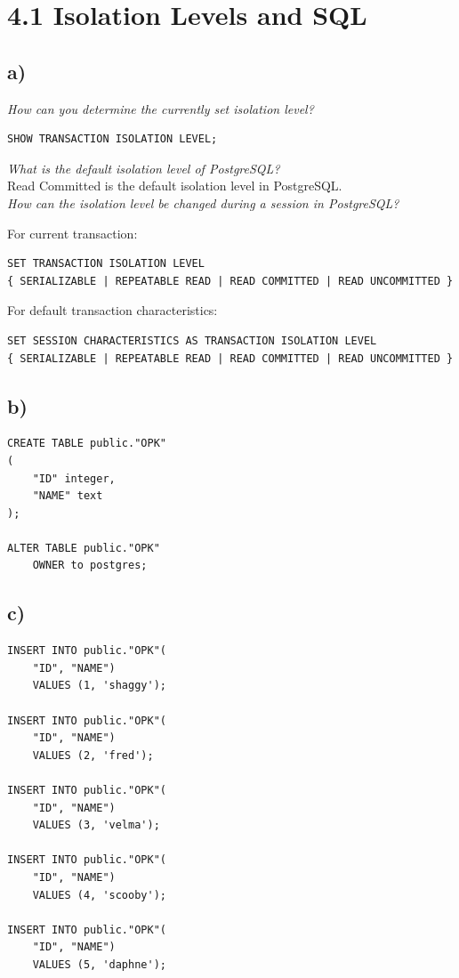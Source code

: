 \documentclass[ngerman]{dis-template-add}
\begin{document}
\section*{4.1 Isolation Levels and SQL}

\subsection*{a)}

\textit{How can you determine the currently set isolation level?
}
\begin{verbatim}
SHOW TRANSACTION ISOLATION LEVEL;
\end{verbatim}

\textit{What is the default isolation level of PostgreSQL?
} \\
Read Committed is the default isolation level in PostgreSQL. \\

\textit{How can the isolation level be changed during a session in PostgreSQL?}

For current transaction:
\begin{verbatim}
SET TRANSACTION ISOLATION LEVEL
{ SERIALIZABLE | REPEATABLE READ | READ COMMITTED | READ UNCOMMITTED }
\end{verbatim}

For default transaction characteristics:
\begin{verbatim}
SET SESSION CHARACTERISTICS AS TRANSACTION ISOLATION LEVEL
{ SERIALIZABLE | REPEATABLE READ | READ COMMITTED | READ UNCOMMITTED }
\end{verbatim}


\subsection*{b)}

\begin{verbatim}
CREATE TABLE public."OPK"
(
    "ID" integer,
    "NAME" text
);

ALTER TABLE public."OPK"
    OWNER to postgres;
\end{verbatim}


\subsection*{c)}

\begin{verbatim}
INSERT INTO public."OPK"(
    "ID", "NAME")
    VALUES (1, 'shaggy');

INSERT INTO public."OPK"(
    "ID", "NAME")
    VALUES (2, 'fred');
	
INSERT INTO public."OPK"(
    "ID", "NAME")
    VALUES (3, 'velma');
	
INSERT INTO public."OPK"(
    "ID", "NAME")
    VALUES (4, 'scooby');
	
INSERT INTO public."OPK"(
    "ID", "NAME")
    VALUES (5, 'daphne');
\end{verbatim}
\end{document}

